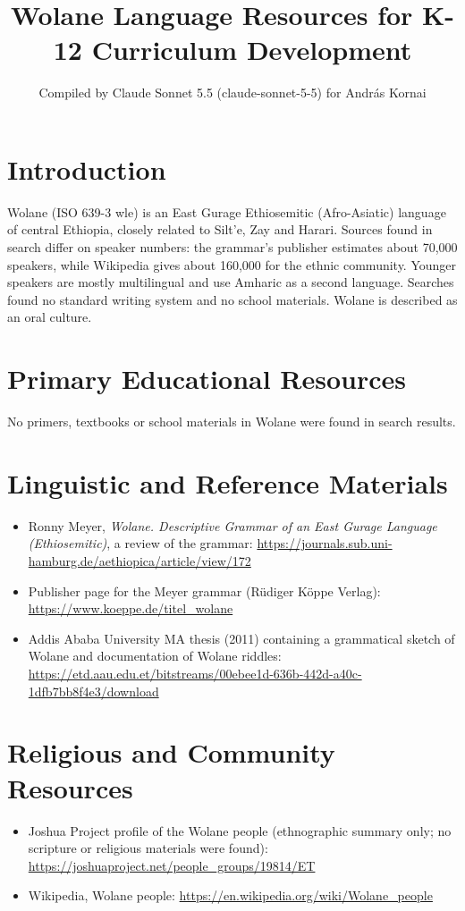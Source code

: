 \documentclass[12pt]{article}
\title{Wolane Language Resources for K-12 Curriculum Development}
\author{Compiled by Claude Sonnet 5.5 (claude-sonnet-5-5) for Andr\'as Kornai}
\date{}
\begin{document}
\maketitle

\section{Introduction}
Wolane (ISO 639-3 wle) is an East Gurage Ethiosemitic (Afro-Asiatic) language of central Ethiopia, closely related to Silt'e, Zay and Harari. Sources found in search differ on speaker numbers: the grammar's publisher estimates about 70,000 speakers, while Wikipedia gives about 160,000 for the ethnic community. Younger speakers are mostly multilingual and use Amharic as a second language. Searches found no standard writing system and no school materials. Wolane is described as an oral culture.

\section{Primary Educational Resources}
No primers, textbooks or school materials in Wolane were found in search results.

\section{Linguistic and Reference Materials}
\begin{itemize}
\item Ronny Meyer, \emph{Wolane. Descriptive Grammar of an East Gurage Language (Ethiosemitic)}, a review of the grammar: \url{https://journals.sub.uni-hamburg.de/aethiopica/article/view/172}
\item Publisher page for the Meyer grammar (R\"udiger K\"oppe Verlag): \url{https://www.koeppe.de/titel_wolane}
\item Addis Ababa University MA thesis (2011) containing a grammatical sketch of Wolane and documentation of Wolane riddles: \url{https://etd.aau.edu.et/bitstreams/00ebee1d-636b-442d-a40c-1dfb7bb8f4e3/download}
\end{itemize}

\section{Religious and Community Resources}
\begin{itemize}
\item Joshua Project profile of the Wolane people (ethnographic summary only; no scripture or religious materials were found): \url{https://joshuaproject.net/people_groups/19814/ET}
\item Wikipedia, Wolane people: \url{https://en.wikipedia.org/wiki/Wolane_people}
\end{itemize}
\end{document}
